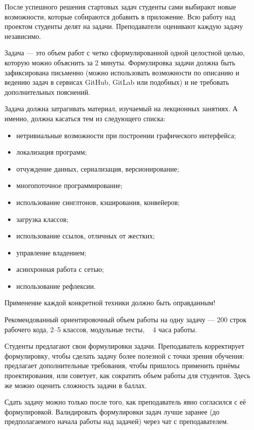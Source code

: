 \documentclass[a4paper,12pt]{article}
\begin{document}
После успешного решения стартовых задач студенты сами выбирают новые возможности, которые собираются добавить в приложение. Всю работу над проектом студенты делят на задачи. Преподаватели оценивают каждую задачу независимо.

Задача — это объем работ с четко сформулированной одной целостной целью, которую можно объяснить за 2 минуты. Формулировка задачи должна быть зафиксирована письменно (можно использовать возможности по описанию и ведению задач в сервисах GitHub, GitLab или подобных) и не требовать дополнительных пояснений.

Задача должна затрагивать материал, изучаемый на лекционных занятиях. А именно, должна касаться тем из следующего списка:
\begin{itemize}
    \item нетривиальные возможности при построении графического интерфейса;
    \item локализация программ;
    \item отчуждение данных, сериализация, версионирование;
    \item многопоточное программирование;
    \item использование синглтонов, кэширования, конвейеров;
    \item загрузка классов;
    \item использование ссылок, отличных от жестких;
    \item управление владением;
    \item асинхронная работа с сетью;
    \item использование рефлексии.
\end{itemize}
Применение каждой конкретной техники должно быть оправданным!

Рекомендованный ориентировочный объем работы на одну задачу — 200 строк рабочего кода, 2–5 классов, модульные тесты, ~ 4 часа работы.

Студенты предлагают свои формулировки задачи. Преподаватель корректирует формулировку, чтобы сделать задачу более полезной с точки зрения обучения: предлагает дополнительные требования, чтобы пришлось применить приёмы проектирования, или советует, как сократить объем работы для студентов. Здесь же можно оценить сложность задачи в баллах.

Сдать задачу можно только после того, как преподаватель явно согласился с её формулировкой. Валидировать формулировки задач лучше заранее (до предполагаемого начала работы над задачей) через чат  с преподавателем.
\end{document}
